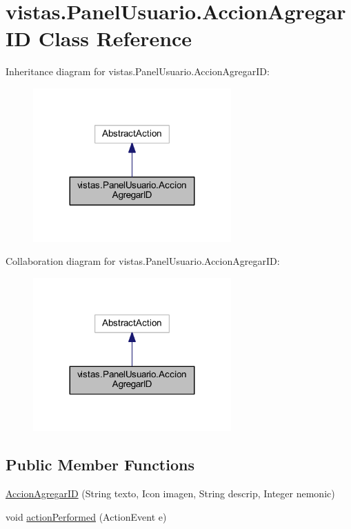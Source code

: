 \hypertarget{classvistas_1_1_panel_usuario_1_1_accion_agregar_i_d}{}\section{vistas.\+Panel\+Usuario.\+Accion\+Agregar\+ID Class Reference}
\label{classvistas_1_1_panel_usuario_1_1_accion_agregar_i_d}


Inheritance diagram for vistas.\+Panel\+Usuario.\+Accion\+Agregar\+ID\+:
\nopagebreak
\begin{figure}[H]
\begin{center}
\leavevmode
\includegraphics[width=215pt]{classvistas_1_1_panel_usuario_1_1_accion_agregar_i_d__inherit__graph}
\end{center}
\end{figure}


Collaboration diagram for vistas.\+Panel\+Usuario.\+Accion\+Agregar\+ID\+:
\nopagebreak
\begin{figure}[H]
\begin{center}
\leavevmode
\includegraphics[width=215pt]{classvistas_1_1_panel_usuario_1_1_accion_agregar_i_d__coll__graph}
\end{center}
\end{figure}
\subsection*{Public Member Functions}
\begin{DoxyCompactItemize}
\item 
\mbox{\hyperlink{classvistas_1_1_panel_usuario_1_1_accion_agregar_i_d_ad241a5ec2a2a9f7a084de6d6b085b16e}{Accion\+Agregar\+ID}} (String texto, Icon imagen, String descrip, Integer nemonic)
\item 
void \mbox{\hyperlink{classvistas_1_1_panel_usuario_1_1_accion_agregar_i_d_af6201c55723abc3b5517c8a18b18faa7}{action\+Performed}} (Action\+Event e)
\end{DoxyCompactItemize}


